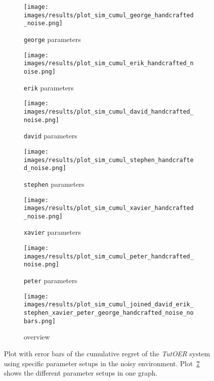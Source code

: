 \begin{figure}[ht]
	\begin{subfigure}{0.48\linewidth}
	\texttt{[image: images/results/plot\_sim\_cumul\_george\_handcrafted\_noise.png]}
	\caption{\texttt{george} parameters}
	\label{fig:cumul_handcrafted_noise_george}
	\end{subfigure}
	\hfill
	\begin{subfigure}{0.48\linewidth}
		\texttt{[image: images/results/plot\_sim\_cumul\_erik\_handcrafted\_noise.png]}
	\caption{\texttt{erik} parameters}
	\label{fig:cumul_handcrafted_noise_erik}
	\end{subfigure}
	\begin{subfigure}{0.48\linewidth}
	\texttt{[image: images/results/plot\_sim\_cumul\_david\_handcrafted\_noise.png]}
	\caption{\texttt{david} parameters}
	\label{fig:cumul_handcrafted_noise_david}
	\end{subfigure}
	\hfill
	\begin{subfigure}{0.48\linewidth}
	\texttt{[image: images/results/plot\_sim\_cumul\_stephen\_handcrafted\_noise.png]}
	\caption{\texttt{stephen} parameters}
	\label{fig:cumul_handcrafted_noise_stephen}
	\end{subfigure}
	\begin{subfigure}{0.48\linewidth}
	\texttt{[image: images/results/plot\_sim\_cumul\_xavier\_handcrafted\_noise.png]}
	\caption{\texttt{xavier} parameters}
	\label{fig:cumul_handcrafted_noise_xavier}
	\end{subfigure}
	\hfill
	\begin{subfigure}{0.48\linewidth}
	\texttt{[image: images/results/plot\_sim\_cumul\_peter\_handcrafted\_noise.png]}
	\caption{\texttt{peter} parameters}
	\label{fig:cumul_handcrafted_noise_peter}
	\end{subfigure}
	\begin{subfigure}{\linewidth}
	\texttt{[image: images/results/plot\_sim\_cumul\_joined\_david\_erik\_stephen\_xavier\_peter\_george\_handcrafted\_noise\_nobars.png]}
	\caption{overview}
	\label{fig:cumul_handcrafted_noise_overview_group1}
	\end{subfigure}
	\caption[Cumulative regret in noisy simulated environment for group 1]{Plot with error bars of the cumulative regret of the \emph{TutOER}
	system using specific parameter setups in the noisy environment.
	Plot~\ref{fig:cumul_handcrafted_noise_overview_group1} shows the
	different parameter setups in one graph.}
	\label{fig:cumul_handcrafted_noise_container_group1}
\end{figure}

